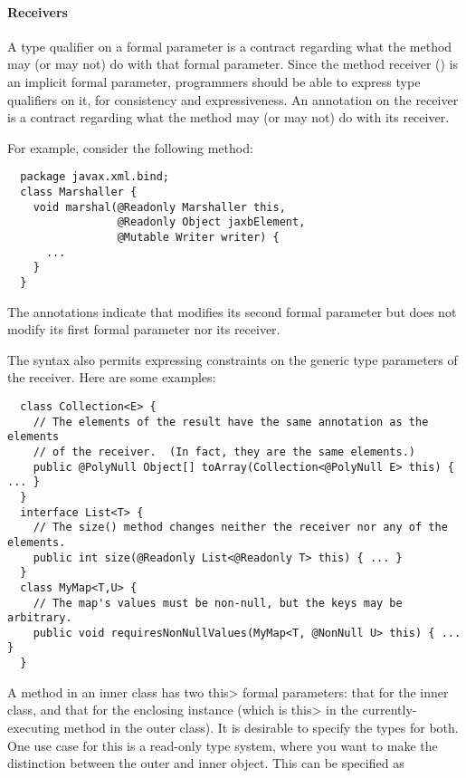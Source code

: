 \documentclass[10pt]{article}
\newcommand{\preverbnegspace}{\vspace{-5pt}}
\begin{document}
\paragraph{Receivers\label{receivers}}
A type qualifier on a formal parameter is a contract regarding what the
method may (or may not) do with that formal parameter.  Since the method receiver
() is an implicit formal parameter, programmers should be able
to express type qualifiers on it, for consistency and expressiveness.  An
annotation on the receiver is a contract regarding what the method may
(or may not) do with its receiver.



For example, consider the following method:

\preverbnegspace
\begin{Verbatim}
  package javax.xml.bind;
  class Marshaller {
    void marshal(@Readonly Marshaller this,
                 @Readonly Object jaxbElement,
                 @Mutable Writer writer) {
      ...
    }
  }
\end{Verbatim}

\noindent
The annotations indicate that  modifies its second formal parameter
but does not modify its first formal parameter nor its receiver.

The syntax also permits expressing constraints on the
generic type parameters of the receiver.  Here are some examples:

\preverbnegspace
\begin{Verbatim}
  class Collection<E> {
    // The elements of the result have the same annotation as the elements
    // of the receiver.  (In fact, they are the same elements.)
    public @PolyNull Object[] toArray(Collection<@PolyNull E> this) { ... }
  }
  interface List<T> {
    // The size() method changes neither the receiver nor any of the elements.
    public int size(@Readonly List<@Readonly T> this) { ... }
  }
  class MyMap<T,U> {
    // The map's values must be non-null, but the keys may be arbitrary.
    public void requiresNonNullValues(MyMap<T, @NonNull U> this) { ... }
  }
\end{Verbatim}

A method in an inner class has two \<this> formal parameters:  that for the inner
class, and that for the enclosing instance (which is \<this> in the currently-executing method in the outer class).  It
is desirable to specify the types for both.  
One use case for this is a read-only type system, where you want to
make the distinction between the outer and inner object.
This can be specified as
\end{document}
